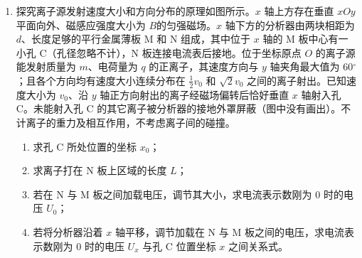 \documentclass[\gkver]{gaokaozhenti}
\begin{document}
\begin{enumerate}
\item
探究离子源发射速度大小和方向分布的原理如图所示。$x$ 轴上方存在垂直 $xOy$ 平面向外、磁感应强度大小为 $B $的匀强磁场。$x$ 轴下方的分析器由两块相距为 $d$、长度足够的平行金属薄板 M 和 N 组成，其中位于 $x$ 轴的 M 板中心有一小孔 C（孔径忽略不计），N 板连接电流表后接地。位于坐标原点 $O$ 的离子源能发射质量为 $m$、电荷量为 $q$ 的正离子，其速度方向与 $y$ 轴夹角最大值为 60${^\circ}$；且各个方向均有速度大小连续分布在 $\frac{1}{2} v_{0}$ 和 $\sqrt 2  v_{0}$ 之间的离子射出。已知速度大小为 $v_{0}$、沿 $y$ 轴正方向射出的离子经磁场偏转后恰好垂直 $x$ 轴射入孔 C。未能射入孔 C 的其它离子被分析器的接地外罩屏蔽（图中没有画出）。不计离子的重力及相互作用，不考虑离子间的碰撞。
\begin{enumerate}
	\item
	求孔 C 所处位置的坐标 $x_{0}$；
	\item
	求离子打在 N 板上区域的长度 $L$；
	\item
	若在 N 与 M 板之间加载电压，调节其大小，求电流表示数刚为 0 时的电压 $U_{0}$；
	\item
	若将分析器沿着 $x$ 轴平移，调节加载在 N 与 M 板之间的电压，求电流表示数刚为 0 时的电压 $U_{x}$ 与孔 C 位置坐标 $x$ 之间关系式。
\end{enumerate}
\end{enumerate}
\end{document}
